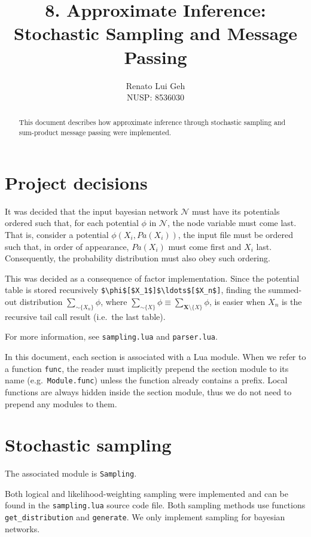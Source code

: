 \documentclass{amsart}
\title[]{8. Approximate Inference: Stochastic Sampling and Message Passing}
\author[]{Renato Lui Geh\\NUSP\@: 8536030}
\theoremstyle{plain}
\newcommand{\code}[1]{\lstinline[mathescape=true]{#1}}
\newcommand{\mcode}[1]{\lstinline[mathescape]!#1!}
\begin{document}
\begin{abstract}
  This document describes how approximate inference through stochastic sampling and sum-product
  message passing were implemented.
  \vspace*{-2.5em}
\end{abstract}

\maketitle

\section{Project decisions}

It was decided that the input bayesian network $\mathcal{N}$ must have its potentials ordered such
that, for each potential $\phi$ in $\mathcal{N}$, the node variable must come last. That is,
consider a potential $\phi(X_i,Pa(X_i))$, the input file must be ordered such that, in order of
appearance, $Pa(X_i)$ must come first and $X_i$ last. Consequently, the probability distribution
must also obey such ordering.

This was decided as a consequence of factor implementation. Since the potential table is stored
recursively \mcode{$\phi$[$X_1$]$\ldots$[$X_n$]}, finding the summed-out distribution
$\sum_{\sim \{X_n\}} \phi$, where $\sum_{\sim \{X\}} \phi \equiv \sum_{\mathbf{X}\setminus \{X\}}
\phi$, is easier when $X_n$ is the recursive tail call result (i.e.\ the last table).

For more information, see \code{sampling.lua} and \code{parser.lua}.

In this document, each section is associated with a Lua module. When we refer to a function
\code{func}, the reader must implicitly prepend the section module to its name (e.g.\
\code{Module.func}) unless the function already contains a prefix. Local functions are always
hidden inside the section module, thus we do not need to prepend any modules to them.

\section{Stochastic sampling}

The associated module is \code{Sampling}.

Both logical and likelihood-weighting sampling were implemented and can be found in the
\code{sampling.lua} source code file. Both sampling methods use functions \code{get_distribution}
and \code{generate}. We only implement sampling for bayesian networks.
\end{document}
